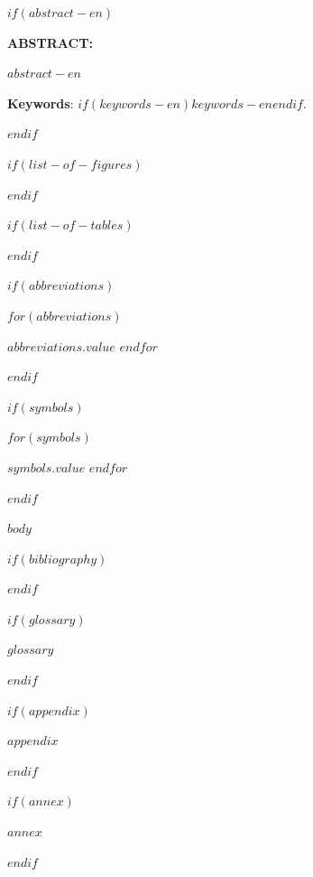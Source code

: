 \documentclass[
  12pt,
  oneside,
  a4paper,
  chapter=TITLE,
  english,
  portuguese
]{abntex2}
\begin{document}
$if(abstract-en)$
\newpage
\thispagestyle{empty}
\renewcommand{\resumoname}{Abstract}
\begin{resumoumacoluna}
\noindent\textbf{ABSTRACT:}\vspace{\onelineskip}

$abstract-en$

\vspace{\onelineskip}
\noindent\textbf{Keywords}: $if(keywords-en)$$keywords-en$$endif$.
\end{resumoumacoluna}
\clearpage
$endif$

$if(list-of-figures)$
\listoffigures*
\cleardoublepage
$endif$

$if(list-of-tables)$
\listoftables*
\cleardoublepage
$endif$

$if(abbreviations)$
\begin{siglas}
$for(abbreviations)$
  \item[$abbreviations.key$] $abbreviations.value$
$endfor$
\end{siglas}
$endif$

$if(symbols)$
\begin{simbolos}
$for(symbols)$
  \item[$symbols.key$] $symbols.value$
$endfor$
\end{simbolos}
$endif$

\tableofcontents*
\cleardoublepage

\textual
\makeatletter
\let\@afterindentfalse\@afterindenttrue
\makeatother
\setcounter{secnumdepth}{3}
\setlength{\parindent}{1.3cm}

$body$

\postextual

$if(bibliography)$


$endif$

$if(glossary)$
\begin{glossario}
$glossary$
\end{glossario}
$endif$

$if(appendix)$
\begin{apendicesenv}
$appendix$
\end{apendicesenv}
$endif$

$if(annex)$
\begin{anexosenv}
$annex$
\end{anexosenv}
$endif$
\end{document}
